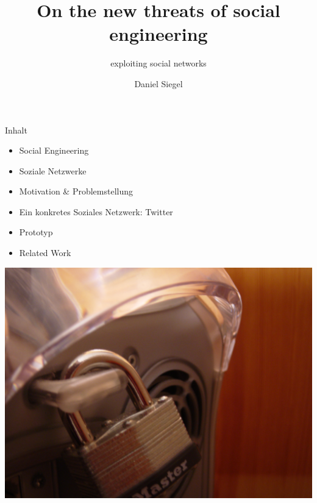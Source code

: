 \documentclass[11pt]{beamer}
\author{Daniel Siegel}
\title{On the new threats of social engineering}%
\subtitle{exploiting social networks}
\institute{13. August 2009}
\date{}
\begin{document}
\begin{frame}[t,plain]
\titlepage
\end{frame}

\begin{frame}[t]{Inhalt}
  \begin{itemize}
    \item Social Engineering
    \item Soziale Netzwerke
    \item Motivation \& Problemstellung
    \item Ein konkretes Soziales Netzwerk: Twitter
    \item Prototyp
    \item Related Work
  \end{itemize}
\end{frame}


\begin{frame}[t]
\vspace{-1em}
  \begin{center}
    \includegraphics[height=0.95\textheight]{security}
  \end{center}
\end{frame}
\end{document}
